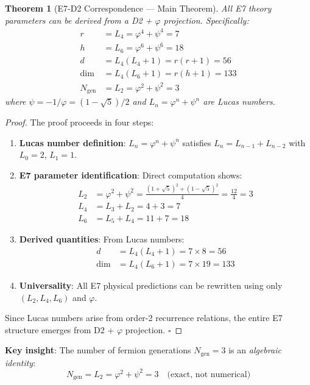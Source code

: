 \documentclass[11pt,a4paper]{article}
\newtheorem{theorem}{Theorem}
\begin{document}
\begin{theorem}[E7-D2 Correspondence --- Main Theorem]
All E7 theory parameters can be derived from a D2 + $\varphi$ projection. Specifically:
\begin{align}
r &= L_4 = \varphi^4 + \psi^4 = 7 \\
h &= L_6 = \varphi^6 + \psi^6 = 18 \\
d &= L_4(L_4 + 1) = r(r+1) = 56 \\
\dim &= L_4(L_6 + 1) = r(h+1) = 133 \\
N_{\text{gen}} &= L_2 = \varphi^2 + \psi^2 = 3
\end{align}
where $\psi = -1/\varphi = (1-\sqrt{5})/2$ and $L_n = \varphi^n + \psi^n$ are Lucas numbers.
\end{theorem}

\begin{proof}
The proof proceeds in four steps:
\begin{enumerate}
\item \textbf{Lucas number definition}: $L_n = \varphi^n + \psi^n$ satisfies $L_n = L_{n-1} + L_{n-2}$ with $L_0 = 2$, $L_1 = 1$.
\item \textbf{E7 parameter identification}: Direct computation shows:
\begin{align}
L_2 &= \varphi^2 + \psi^2 = \frac{(1+\sqrt{5})^2 + (1-\sqrt{5})^2}{4} = \frac{12}{4} = 3 \\
L_4 &= L_3 + L_2 = 4 + 3 = 7 \\
L_6 &= L_5 + L_4 = 11 + 7 = 18
\end{align}
\item \textbf{Derived quantities}: From Lucas numbers:
\begin{align}
d &= L_4(L_4+1) = 7 \times 8 = 56 \\
\dim &= L_4(L_6+1) = 7 \times 19 = 133
\end{align}
\item \textbf{Universality}: All E7 physical predictions can be rewritten using only $(L_2, L_4, L_6)$ and $\varphi$.
\end{enumerate}
Since Lucas numbers arise from order-2 recurrence relations, the entire E7 structure emerges from D2 + $\varphi$ projection. \hfill $\square$
\end{proof}

\textbf{Key insight}: The number of fermion generations $N_{\text{gen}} = 3$ is an \textit{algebraic identity}:
\begin{equation}
N_{\text{gen}} = L_2 = \varphi^2 + \psi^2 = 3 \quad \text{(exact, not numerical)}
\end{equation}
\end{document}
